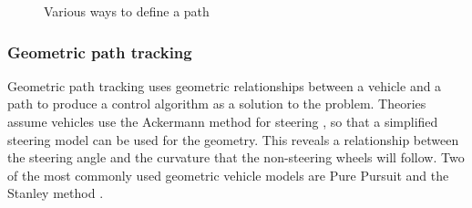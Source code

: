 \documentclass[main.tex]{subfiles}
\begin{document}
\begin{figure}[htbp]
\centering
{}\hspace{1em}%
\hspace{1em}%
\caption[Various ways to define a path]{Various ways to define a path \parencite{Giesbrecht2005}}
\end{figure}

\subsubsection{Geometric path tracking}
Geometric path tracking uses geometric relationships between a vehicle and a path to produce a control algorithm as a solution to the problem. Theories assume vehicles use the Ackermann method for steering \parencite{Lundgren2003}, so that a simplified steering model can be used for the geometry. This reveals a relationship between the steering angle and the curvature that the non-steering wheels will follow. Two of the most commonly used geometric vehicle models are Pure Pursuit and the Stanley method \parencite{snider2009}.
\end{document}

